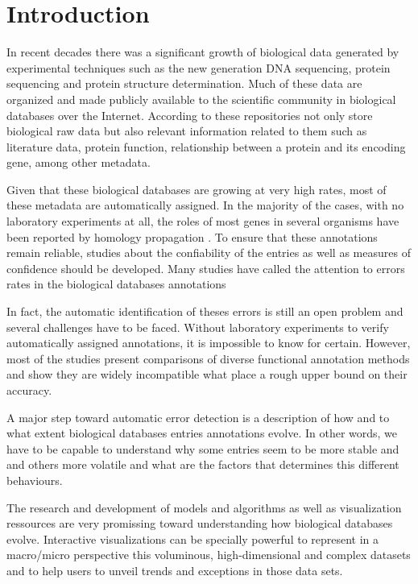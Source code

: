 \section{Introduction} 

In recent decades there was a significant growth of biological data generated by experimental techniques such as the new generation DNA sequencing, protein sequencing and protein structure determination. Much of these data are organized and made publicly available to the scientific community in biological databases over the Internet. According to \cite{lesk2005database} these repositories not only store biological raw data but also relevant information related to them such as literature data, protein function, relationship between a protein and its encoding gene, among other metadata.

Given that these biological databases are growing at very high rates, most of these metadata are automatically assigned. In the majority of the cases, with no laboratory experiments at all, the roles of most genes in several organisms have been reported by homology propagation \cite{brenner1999errors}. To ensure that these annotations remain reliable, studies about the confiability of the entries as well as measures of confidence should be developed. Many studies have called the attention to errors rates in the biological databases annotations \cite{devos2001intrinsic,green2005genome,jones2007estimating,schnoes2009annotation,hung2010detect}

In fact, the automatic identification of theses errors is still an open problem and several challenges have to be faced. Without laboratory experiments to verify automatically assigned annotations, it is impossible to know for certain. However, most of the studies present comparisons of diverse functional annotation methods and show they are widely incompatible what place a rough upper bound on their accuracy. 

A major step toward automatic error detection is a description of how and to what extent biological databases entries annotations evolve. In other words, we have to be capable to understand why some entries seem to be more stable and and others more volatile and what are the factors that determines this different behaviours.

The research and development of models and algorithms as well as visualization ressources are very promissing toward understanding how biological databases evolve. Interactive visualizations can be specially powerful to represent in a macro/micro perspective this voluminous, high-dimensional and complex datasets and to help users to unveil trends and exceptions in those data sets. 

